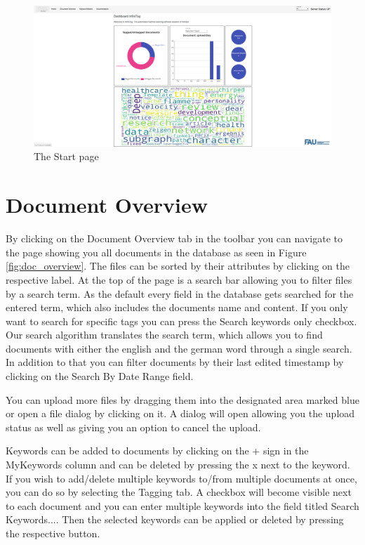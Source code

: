 \documentclass{article}
\begin{document}
\begin{figure}
    \centering
    \includegraphics[scale=0.25]{img/dashboard.png}
    \caption{The Start page}
    \label{fig:start_page}
\end{figure}


\section{Document Overview} \label{docoverview}

By clicking on the Document Overview tab in the toolbar you can navigate to the page showing you all documents in the database as seen in Figure \ref{fig:doc_overview}.
The files can be sorted by their attributes by clicking on the respective label. At the top of the page is a search bar allowing you to filter files by a search term.
As the default every field in the database gets searched for the entered term, which also includes the documents name and content.
If you only want to search for specific tags you can press the Search keywords only checkbox.
Our search algorithm translates the search term, which allows you to find documents with either the english and the german word through a single search.
In addition to that you can filter documents by their last edited timestamp by clicking on the Search By Date Range field.


You can upload more files by dragging them into the designated area marked blue or open a file dialog by clicking on it.
A dialog will open allowing you the upload status as well as giving you an option to cancel the upload.


Keywords can be added to documents by clicking on the + sign in the MyKeywords column and can be deleted by pressing the x next to the keyword.
If you wish to add/delete multiple keywords to/from multiple documents at once, you can do so by selecting the Tagging tab.
A checkbox will become visible next to each document and you can enter multiple keywords into the field titled Search Keywords....
Then the selected keywords can be applied or deleted by pressing the respective button.
\end{document}
